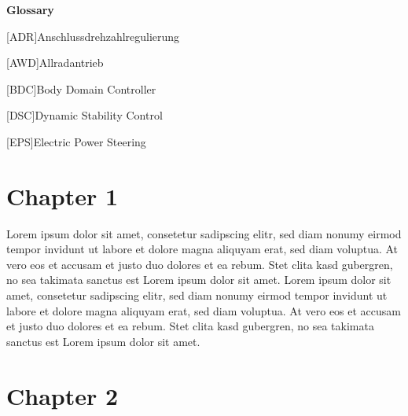 \documentclass[11pt, a4paper]{article}
\begin{document}
\tableofcontents
\newpage



\noindent
\textbf{\Large{Glossary}}\\

\begin{acronym} [ADR]{Anschlussdrehzahlregulierung} \end{acronym}
\begin{acronym} [AWD]{Allradantrieb} \end{acronym}
\begin{acronym} [BDC]{Body Domain Controller} \end{acronym}
\begin{acronym} [DSC]{Dynamic Stability Control} \end{acronym}
\begin{acronym} [EPS]{Electric Power Steering} \end{acronym}



\newpage
{}	%
\setcounter{page}{1} %



\section{Chapter 1}
Lorem ipsum dolor sit amet, consetetur sadipscing elitr, sed diam nonumy eirmod tempor invidunt ut labore et dolore magna aliquyam erat, sed diam voluptua. At vero eos et accusam et justo duo dolores et ea rebum. Stet clita kasd gubergren, no sea takimata sanctus est Lorem ipsum dolor sit amet. Lorem ipsum dolor sit amet, consetetur sadipscing elitr, sed diam nonumy eirmod tempor invidunt ut labore et dolore magna aliquyam erat, sed diam voluptua. At vero eos et accusam et justo duo dolores et ea rebum. Stet clita kasd gubergren, no sea takimata sanctus est Lorem ipsum dolor sit amet.\\



\section{Chapter 2}
\end{document}

